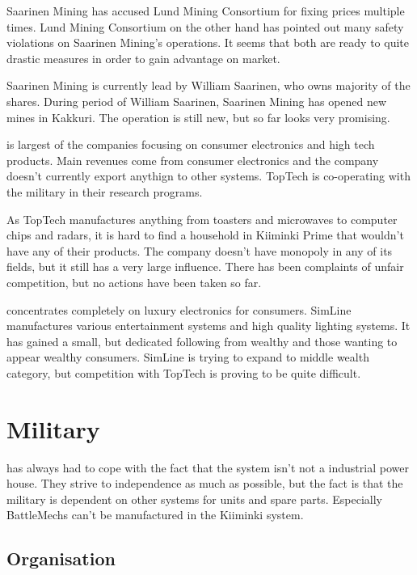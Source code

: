 \documentclass{tufte-book}
\begin{document}
Saarinen Mining has accused Lund Mining Consortium for fixing prices multiple
times. Lund Mining Consortium on the other hand has pointed out many safety
violations on Saarinen Mining's operations. It seems that both are ready to
quite drastic measures in order to gain advantage on market.

Saarinen Mining is currently lead by William Saarinen, who owns majority of
the shares. During period of William Saarinen, Saarinen Mining has opened new
mines in Kakkuri. The operation is still new, but so far looks very promising.

 is largest of the companies focusing on consumer
electronics and high tech products. Main revenues come from consumer
electronics and the company doesn't currently export anythign to other
systems. TopTech is co-operating with the military in their research
programs.

As TopTech manufactures anything from toasters and microwaves to computer
chips and radars, it is hard to find a household in Kiiminki Prime that
wouldn't have any of their products. The company doesn't have monopoly in any
of its fields, but it still has a very large influence. There has been
complaints of unfair competition, but no actions have been taken so far.

 concentrates completely on luxury electronics
for consumers. SimLine manufactures various entertainment systems and high
quality lighting systems. It has gained a small, but dedicated following from
wealthy and those wanting to appear wealthy consumers. SimLine is trying to
expand to middle wealth category, but competition with TopTech is proving to
be quite difficult.

\chapter{Military}
\label{ch:military}

 has always had to cope with the fact
that the system isn't not a industrial power house. They strive to
independence as much as possible, but the fact is that the military
is dependent on other systems for units and spare parts. Especially
BattleMechs can't be manufactured in the Kiiminki system.

\section{Organisation}
\label{sc:organisation}
\end{document}
